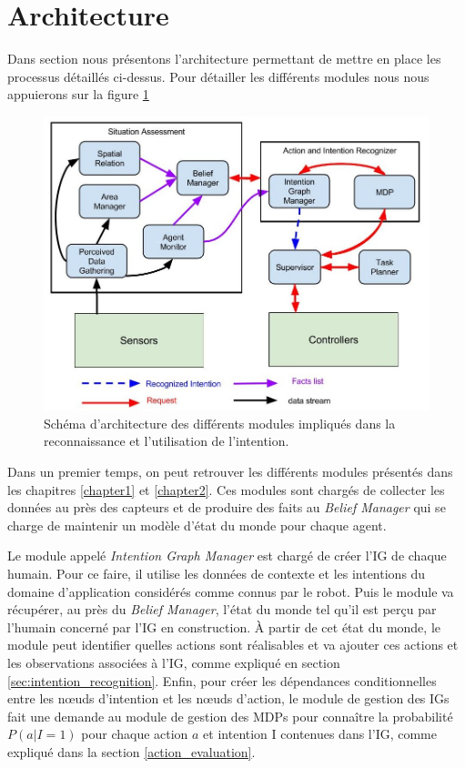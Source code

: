 \documentclass[a4paper,11pt,twoside]{StyleThese}
\begin{document}
\section{Architecture}

Dans section nous présentons l'architecture permettant de mettre en place les processus détaillés ci-dessus.
Pour détailler les différents modules nous nous appuierons sur la figure \ref{fig:intentionArch}

\begin{figure}[ht!]
  \centering
 \includegraphics[width=1.0\linewidth]{./intention/intentionArch.jpg} 
  \caption {Schéma d'architecture des différents modules impliqués dans la reconnaissance et l'utilisation de l'intention.}
  \label{fig:intentionArch}
\end{figure}

Dans un premier temps, on peut retrouver les différents modules présentés dans les chapitres \ref{chapter1} et \ref{chapter2}. Ces modules sont chargés de collecter les données au près des capteurs et de produire des faits au \textit{Belief Manager} qui se charge de maintenir un modèle d'état du monde pour chaque agent.

Le module appelé \textit{Intention Graph Manager} est chargé de créer l'IG de chaque humain. Pour ce faire, il utilise les données de contexte et les intentions du domaine d'application considérés comme connus par le robot. Puis le module va récupérer, au près du \textit{Belief Manager}, l'état du monde tel qu'il est perçu par l'humain concerné par l'IG en construction. À partir de cet état du monde, le module peut identifier quelles actions sont réalisables et va ajouter ces actions et les observations associées à l'IG, comme expliqué en section \ref{sec:intention_recognition}.
Enfin, pour créer les dépendances conditionnelles entre les nœuds d'intention et les nœuds d'action, le module de gestion des IGs fait une demande au module de gestion des MDPs pour connaître la probabilité \(P(a|I=1)\) pour chaque action $a$ et intention I contenues dans l'IG, comme expliqué dans la section \ref{action_evaluation}.
\end{document}
